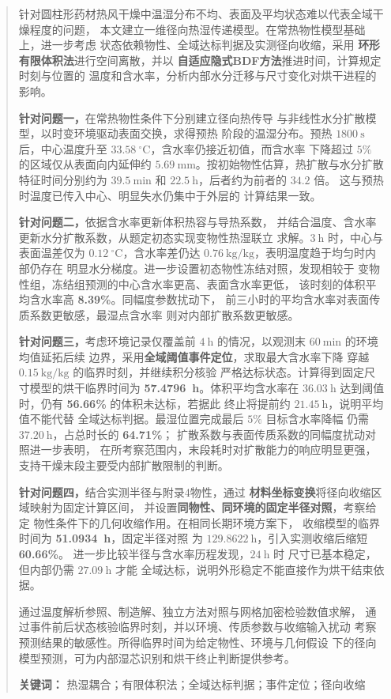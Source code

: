 \begin{abstract}
\normalsize

针对圆柱形药材热风干燥中温湿分布不均、表面及平均状态难以代表全域干燥程度的问题，
本文建立一维径向热湿传递模型。在常热物性模型基础上，进一步考虑
状态依赖物性、全域达标判据及实测径向收缩，采用
\textbf{环形有限体积法}进行空间离散，并以
\textbf{自适应隐式BDF方法}推进时间，计算规定时刻与位置的
温度和含水率，分析内部水分迁移与尺寸变化对烘干进程的影响。

\textbf{针对问题一，}在常热物性条件下分别建立径向热传导
与非线性水分扩散模型，以时变环境驱动表面交换，求得预热
阶段的温湿分布。预热 \(1800~\mathrm{s}\) 后，中心温度升至
\(33.58~^\circ\mathrm{C}\)，含水率仍接近初值，而含水率
下降超过 \(5\%\) 的区域仅从表面向内延伸约
\(5.69~\mathrm{mm}\)。按初始物性估算，热扩散与水分扩散
特征时间分别约为 \(39.5~\mathrm{min}\) 和
\(22.5~\mathrm{h}\)，后者约为前者的 \(34.2\) 倍。
这与预热时温度已传入中心、明显失水仍集中于外层的
计算结果一致。

\textbf{针对问题二，}依据含水率更新体积热容与导热系数，
并结合温度、含水率更新水分扩散系数，从题定初态实现变物性热湿联立
求解。\(3~\mathrm{h}\) 时，中心与表面温差仅为
\(0.12~^\circ\mathrm{C}\)，含水率差仍达
\(0.76~\mathrm{kg/kg}\)，表明温度趋于均匀时内部仍存在
明显水分梯度。进一步设置初态物性冻结对照，发现相较于
变物性组，冻结组预测的中心含水率更高、表面含水率更低，
该时刻的体积平均含水率高 \textbf{8.39\%}。同幅度参数扰动下，
前三小时的平均含水率对表面传质系数更敏感，最湿点含水率
则对内部扩散系数更敏感。

\textbf{针对问题三，}考虑环境记录仅覆盖前 \(4~\mathrm{h}\)
的情况，以观测末 \(60~\mathrm{min}\) 的环境均值延拓后续
边界，采用\textbf{全域阈值事件定位}，求取最大含水率下降
穿越 \(0.15~\mathrm{kg/kg}\) 的临界时刻，并继续积分核验
严格达标状态。计算得到固定尺寸模型的烘干临界时间为
\textbf{57.4796~h}。体积平均含水率在 \(36.03~\mathrm{h}\)
达到阈值时，仍有 \textbf{56.66\%} 的体积未达标，若据此
终止将提前约 \(21.45~\mathrm{h}\)，说明平均值不能代替
全域达标判据。最湿位置完成最后 \(5\%\) 目标含水率降幅
仍需 \(37.20~\mathrm{h}\)，占总时长的 \textbf{64.71\%}；
扩散系数与表面传质系数的同幅度扰动对照进一步表明，
在所考察范围内，末段耗时对扩散能力的响应明显更强，
支持干燥末段主要受内部扩散限制的判断。

\textbf{针对问题四，}结合实测半径与附录4物性，通过
\textbf{材料坐标变换}将径向收缩区域映射为固定计算区间，
并设置\textbf{同物性、同环境的固定半径对照}，考察给定
物性条件下的几何收缩作用。在相同长期环境方案下，
收缩模型的临界时间为 \textbf{51.0934~h}，固定半径对照
为 \(129.8622~\mathrm{h}\)，引入实测收缩后缩短
\textbf{60.66\%}。
进一步比较半径与含水率历程发现，\(24~\mathrm{h}\) 时
尺寸已基本稳定，但内部仍需 \(27.09~\mathrm{h}\) 才能
全域达标，说明外形稳定不能直接作为烘干结束依据。

通过温度解析参照、制造解、独立方法对照与网格加密检验数值求解，
通过事件前后状态核验临界时刻，并以环境、传质参数与收缩输入扰动
考察预测结果的敏感性。所得临界时间为给定物性、环境与几何假设
下的径向模型预测，可为内部湿芯识别和烘干终止判断提供参考。

\vspace{1em}
\noindent\textbf{关键词：}
热湿耦合；有限体积法；全域达标判据；事件定位；径向收缩

\end{abstract}
